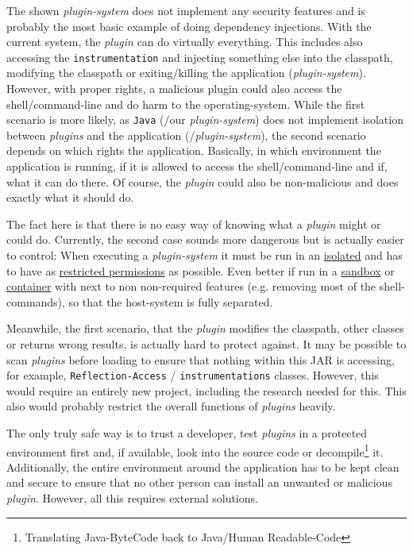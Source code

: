 The shown \textit{plugin-system} does not implement any security features and is probably the most basic example of doing dependency injections.
With the current system, the \textit{plugin} can do virtually everything.
This includes also accessing the \lstinline{instrumentation} and injecting something else into the classpath, modifying the classpath or exiting/killing the application (\textit{plugin-system}).
However, with proper rights, a malicious plugin could also access the shell/command-line and do harm to the operating-system.
While the first scenario is more likely, as \texttt{Java} (/our \textit{plugin-system}) does not implement isolation between \textit{plugins} and the application (/\textit{plugin-system}), the second scenario depends on which rights the application.
Basically, in which environment the application is running, if it is allowed to access the shell/command-line and if, what it can do there.
Of course, the \textit{plugin} could also be non-malicious and does exactly what it should do.

The fact here is that there is no easy way of knowing what a \textit{plugin} might or could do.
Currently, the second case sounds more dangerous but is actually easier to control: 
When executing a \textit{plugin-system} it must be run in an \underline{isolated} and has to have as \underline{restricted permissions} as possible.
Even better if run in a \underline{sandbox} or \underline{container} with next to non non-required features (e.g. removing most of the shell-commands), so that the host-system is fully separated.

Meanwhile, the first scenario, that the \textit{plugin} modifies the classpath, other classes or returns wrong results, is actually hard to protect against.
It may be possible to scan \textit{plugins} before loading to ensure that nothing within this JAR is accessing, for example, \texttt{Reflection-Access} / \lstinline{instrumentations} classes.
However, this would require an entirely new project, including the research needed for this.
This also would probably restrict the overall functions of \textit{plugins} heavily.

The only truly safe way is to trust a developer, test \textit{plugins} in a protected environment first and, if available, look into the source code or decompile\footnote{Translating Java-ByteCode back to Java/Human Readable-Code} it.
Additionally, the entire environment around the application has to be kept clean and secure to ensure that no other person can install an unwanted or malicious \textit{plugin}.
However, all this requires external solutions.

